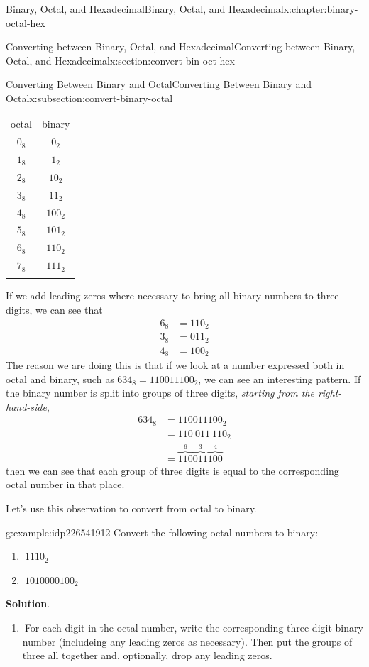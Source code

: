 \documentclass[twoside,10pt,]{book}
\newcommand{\blocktitlefont}{\relax}
\newcommand{\tabularfont}{\relax}
\numberwithin{equation}{section}
\newcommand{\hrulemedium}{\noalign{\hrule height 0.07em}}
\newcommand{\hrulethick} {\noalign{\hrule height 0.11em}}
\newcommand{\amp}{&}
\begin{document}
\begin{chapterptx}{Binary, Octal, and Hexadecimal}{}{Binary, Octal, and Hexadecimal}{}{}{x:chapter:binary-octal-hex}
\begin{sectionptx}{Converting between Binary, Octal, and Hexadecimal}{}{Converting between Binary, Octal, and Hexadecimal}{}{}{x:section:convert-bin-oct-hex}
\begin{subsectionptx}{Converting Between Binary and Octal}{}{Converting Between Binary and Octal}{}{}{x:subsection:convert-binary-octal}
\begin{center}
{\tabularfont%
\begin{tabular}{cc}\hrulethick
octal&binary\tabularnewline\hrulemedium
\(0_8\)&\(0_2\)\tabularnewline[0pt]
\(1_8\)&\(1_2\)\tabularnewline[0pt]
\(2_8\)&\(10_2\)\tabularnewline[0pt]
\(3_8\)&\(11_2\)\tabularnewline[0pt]
\(4_8\)&\(100_2\)\tabularnewline[0pt]
\(5_8\)&\(101_2\)\tabularnewline[0pt]
\(6_8\)&\(110_2\)\tabularnewline[0pt]
\(7_8\)&\(111_2\)\tabularnewline\hrulethick
\end{tabular}
}%
\end{center}%
%
\par
If we add leading zeros where necessary to bring all binary numbers to three digits, we can see that%
\begin{align*}
6_8 \amp = 110_2\\
3_8 \amp = 011_2\\
4_8 \amp = 100_2
\end{align*}
The reason we are doing this is that if we look at a number expressed both in octal and binary, such as \(634_8=110011100_2\), we can see an interesting pattern.  If the binary number is split into groups of three digits, \emph{starting from the right-hand-side},%
\begin{align*}
634_8 \amp = 110011100_2\\
\amp = 110\ 011\ 110_2\\
\amp = \overbrace{110}^{6}\overbrace{011}^{3}\overbrace{100}^{4}
\end{align*}
then we can see that each group of three digits is equal to the corresponding octal number in that place.%
\par
Let's use this observation to convert from octal to binary.  \begin{example}{}{g:example:idp226541912}%
Convert the following octal numbers to binary: %
\begin{enumerate}
\item{}\(\displaystyle \ 1110_2\)%
\item{}\(\displaystyle \ 1010000100_2\)%
\end{enumerate}
\par\smallskip%
\noindent\textbf{\blocktitlefont Solution}.\label{g:solution:idp226547288}{}\hypertarget{g:solution:idp226547288}{}\quad{}%
\begin{enumerate}
\item{}\(\ \)For each digit in the octal number, write the corresponding three-digit binary number (includeing any leading zeros as necessary).  Then put the groups of three all together and, optionally, drop any leading zeros.%

\end{enumerate}
\end{example}
\end{subsectionptx}
\end{sectionptx}
\end{chapterptx}
\end{document}
